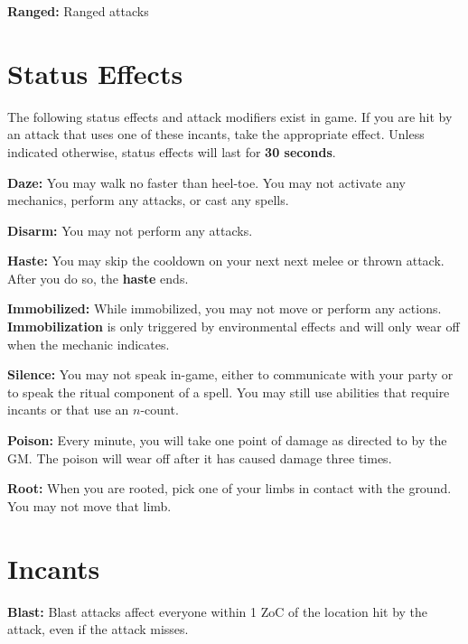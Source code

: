 \documentclass[green]{grimrock}
\begin{document}
{\bf Ranged:} Ranged attacks 




\section{Status Effects}

The following status effects and attack modifiers exist in game.  If you are hit by an attack that uses one of these incants, take the appropriate effect.  Unless indicated otherwise, status effects will last for {\bf 30 seconds}.

{\bf Daze:} You may walk no faster than heel-toe.  You may not activate any mechanics, perform any attacks, or cast any spells.

{\bf Disarm:} You may not perform any attacks.

{\bf Haste:} You may skip the cooldown on your next next melee or thrown attack.  After you do so, the {\bf haste} ends.

{\bf Immobilized:}  While immobilized, you may not move or perform any actions.  {\bf Immobilization} is only triggered by environmental effects and will only wear off when the mechanic indicates.

{\bf Silence:} You may not speak in-game, either to communicate with your party or to speak the ritual component of a spell.  You may still use abilities that require incants or that use an $n$-count.

{\bf Poison:}  Every minute, you will take one point of damage as directed to by the GM.  The poison will wear off after it has caused damage three times.

{\bf Root:} When you are rooted, pick one of your  limbs in contact with the ground.  You may not move that limb.

\section{Incants}

{\bf Blast:} Blast attacks affect everyone within 1 ZoC of the location hit by the attack, even if the attack misses.






\end{document}
